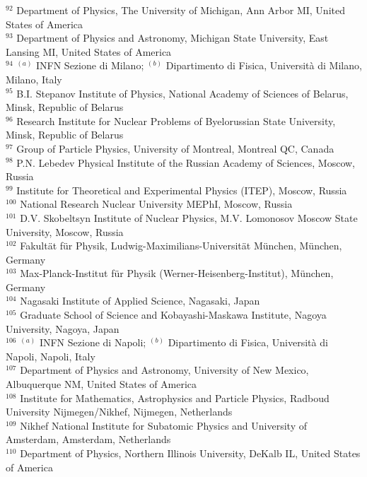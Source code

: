 \begin{flushleft}
$^{92}$ Department of Physics, The University of Michigan, Ann Arbor MI, United States of America\\
$^{93}$ Department of Physics and Astronomy, Michigan State University, East Lansing MI, United States of America\\
$^{94}$ $^{(a)}$ INFN Sezione di Milano; $^{(b)}$ Dipartimento di Fisica, Universit{\`a} di Milano, Milano, Italy\\
$^{95}$ B.I. Stepanov Institute of Physics, National Academy of Sciences of Belarus, Minsk, Republic of Belarus\\
$^{96}$ Research Institute for Nuclear Problems of Byelorussian State University, Minsk, Republic of Belarus\\
$^{97}$ Group of Particle Physics, University of Montreal, Montreal QC, Canada\\
$^{98}$ P.N. Lebedev Physical Institute of the Russian Academy of Sciences, Moscow, Russia\\
$^{99}$ Institute for Theoretical and Experimental Physics (ITEP), Moscow, Russia\\
$^{100}$ National Research Nuclear University MEPhI, Moscow, Russia\\
$^{101}$ D.V. Skobeltsyn Institute of Nuclear Physics, M.V. Lomonosov Moscow State University, Moscow, Russia\\
$^{102}$ Fakult{\"a}t f{\"u}r Physik, Ludwig-Maximilians-Universit{\"a}t M{\"u}nchen, M{\"u}nchen, Germany\\
$^{103}$ Max-Planck-Institut f{\"u}r Physik (Werner-Heisenberg-Institut), M{\"u}nchen, Germany\\
$^{104}$ Nagasaki Institute of Applied Science, Nagasaki, Japan\\
$^{105}$ Graduate School of Science and Kobayashi-Maskawa Institute, Nagoya University, Nagoya, Japan\\
$^{106}$ $^{(a)}$ INFN Sezione di Napoli; $^{(b)}$ Dipartimento di Fisica, Universit{\`a} di Napoli, Napoli, Italy\\
$^{107}$ Department of Physics and Astronomy, University of New Mexico, Albuquerque NM, United States of America\\
$^{108}$ Institute for Mathematics, Astrophysics and Particle Physics, Radboud University Nijmegen/Nikhef, Nijmegen, Netherlands\\
$^{109}$ Nikhef National Institute for Subatomic Physics and University of Amsterdam, Amsterdam, Netherlands\\
$^{110}$ Department of Physics, Northern Illinois University, DeKalb IL, United States of America\\

\end{flushleft}
